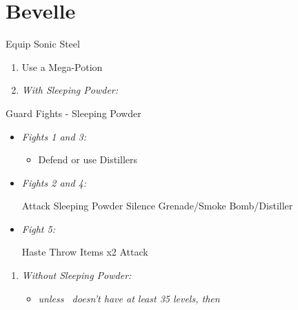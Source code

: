 \chapter{Bevelle}
\begin{equip}
\begin{itemize}

  \tidusf Equip Sonic Steel
  \end{itemize}
  \end{equip}
\begin{enumerate}
  \item Use a Mega-Potion
  \item \textit{With Sleeping Powder:}
\end{enumerate}
\begin{battle}{Guard Fights - Sleeping Powder}
  \begin{itemize}
    \item \textit{Fights 1 and 3:}
          \begin{itemize}
            \tidusf Attack
            \item Defend or use Distillers
          \end{itemize}
    \item \textit{Fights 2 and 4:}
          \begin{itemize}
            \tidusf Attack
            \rikkuf Sleeping Powder
            \kimahrif Silence Grenade/Smoke Bomb/Distiller
          \end{itemize}
    \item \textit{Fight 5:}
          \begin{itemize}
            \tidusf Haste \rikku
            \rikkuf Throw Items x2
            \tidusf Attack
          \end{itemize}
  \end{itemize}
\end{battle}
\begin{enumerate}[resume]
  \item \textit{Without Sleeping Powder:}
        \begin{itemize}
          \item \formation{\tidus}{\rikku}{\auron} \textit{unless \lulu\ doesn't have at least 35 levels, then } \formation{\tidus}{\rikku}{\lulu}
        \end{itemize}
\end{enumerate}
\vfill
